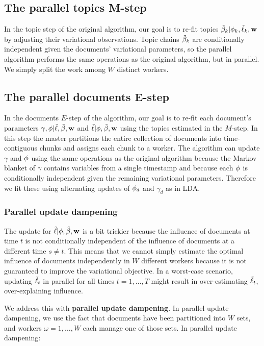 \subsection*{The parallel topics M-step}
In the topic step of the original algorithm, our goal is to re-fit
topics $\tilde{\beta}_k | \phi_k, \tilde{\ell}_k, \textbf{w}$ by adjusting their variational
observations.  Topic chains $\tilde{\beta}_k$ are conditionally independent
given the documents' variational parameters, so the parallel algorithm
performs the same operations as the original algorithm, but in
parallel.  We simply split the work among $W$ distinct workers.

\subsection*{The parallel documents E-step}
In the documents $E$-step of the algorithm, our goal is to re-fit each
document's parameters $\gamma, \phi | \tilde{\ell}, \tilde{\beta}, \textbf{w}$ and $\tilde{\ell} |
\phi, \tilde{\beta}, \textbf{w} $ using the topics estimated in the $M$-step.  In this
step the master partitions the entire collection of documents into
time-contiguous chunks and assigns each chunk to a worker. The
algorithm can update $\gamma$ and $\phi$ using the same operations as
the original algorithm because the Markov blanket of $\gamma$ contains
variables from a single timestamp and because each $\phi$ is
conditionally independent given the remaining variational parameters.
Therefore we fit these using alternating updates of $\phi_{d}$ and
$\gamma_d$ as in LDA.

\subsubsection*{Parallel update dampening}
The update for $\tilde{\ell} | \phi, \tilde{\beta}, \textbf{w}$ is a bit trickier because the
influence of documents at time $t$ is not conditionally independent of
the influence of documents at a different time $s \neq t$.  This means
that we cannot simply estimate the optimal influence of documents
independently in $W$ different workers because it is not guaranteed to
improve the variational objective.  In a worst-case scenario, updating
$\tilde{\ell}_t$ in parallel for all times $t=1, \ldots, T$ might result in
over-estimating $\tilde{\ell}_t$, over-explaining influence.

We address this with \textbf{parallel update dampening}.  In parallel
update dampening, we use the fact that documents have been partitioned into
$W$ sets, and workers $\omega = 1, \ldots, W$ each manage one of those
sets.  In parallel update dampening:


